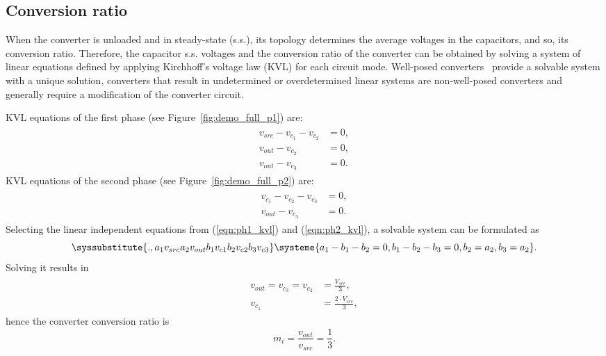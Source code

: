 \subsection{Conversion ratio}
\label{ch:conversion_ratio}
When the converter is unloaded and in steady-state (s.s.), its topology determines the average voltages in the capacitors, and so, its conversion ratio. Therefore, the capacitor s.s. voltages and the conversion ratio of the converter can be obtained by solving a system of linear equations defined by applying Kirchhoff's voltage law (KVL) for each circuit mode. Well-posed converters~\cite{Seeman:EECS-2009-78} provide a solvable system with a unique solution, converters that result in undetermined or overdetermined linear systems are non-well-posed converters and generally require a modification of the converter circuit.

KVL equations of the first phase (see Figure~\ref{fig:demo_full_p1}) are:
\begin{align}
\label{eqn:ph1_kvl}
\begin{split}
  v_{src} - v_{c_1} - v_{c_2} &=0, \\
  v_{out} - v_{c_2}  &=0,\\
  v_{out} - v_{c_3}  &=0.
\end{split}
\end{align}
KVL equations of the second phase (see Figure~\ref{fig:demo_full_p2}) are:
\begin{align}
\label{eqn:ph2_kvl}
\begin{split}
  v_{c_1} - v_{c_2} - v_{c_3} &=0, \\
  v_{out} - v_{c_3}  &=0.
\end{split}
\end{align}
Selecting the linear independent equations from (\ref{eqn:ph1_kvl}) and (\ref{eqn:ph2_kvl}), a solvable system can be formulated as
\begin{equation}
  \syssubstitute{.,{a_1}{v_{src}}{a_2}{v_{out}}{b_1}{v_{c1}}{b_2}{v_{c2}}{b_3}{v_{c3}}}
  \systeme{
    a_1  - b_1 -b_2  = 0,
    b_1 - b_2 - b_3  = 0,
    b_2   = a_2,
    b_3  =  a_2}.
    \label{eqn:sys_kvl}
\end{equation}
Solving it results in
\begin{align}
\label{eqn:sol_kvl}
\begin{split}
  v_{out} =  v_{c_3} = v_{c_2} &=\frac{V_{src}}{3} , \\
  v_{c_1} &=\frac{2 \cdot V_{src}}{3} ,
\end{split}
\end{align}
hence the converter conversion ratio is
\begin{equation}
\label{eqn:m_kvl}
m_i = \frac{v_{out}}{v_{src}} = \frac{1}{3}.
\end{equation}

